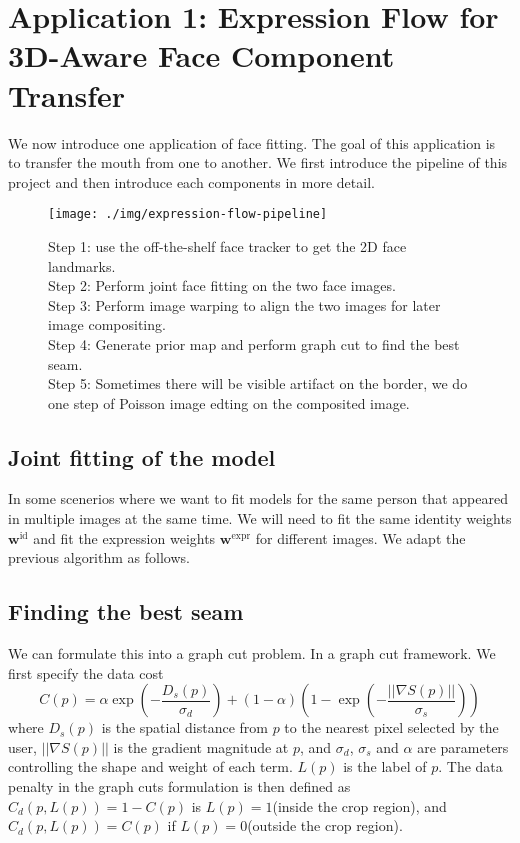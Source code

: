 
\section{Application 1: Expression Flow for 3D-Aware Face
Component Transfer}
We now introduce one application of face fitting. The goal of this application is to transfer the mouth from one to another. We first introduce the pipeline of this project and then introduce each components in more detail.
\begin{figure}[H]
\texttt{[image: ./img/expression-flow-pipeline]}
\caption{Step 1: use the off-the-shelf face tracker to get the 2D face landmarks. \\
Step 2: Perform joint face fitting on the two face images. \\
Step 3: Perform image warping to align the two images for later image compositing. \\
Step 4: Generate prior map and perform graph cut to find the best seam. \\
Step 5: Sometimes there will be visible artifact on the border, we do one step of Poisson image edting on the composited image.}
\end{figure}

\subsection{Joint fitting of the model}
In some scenerios where we want to fit models for the same person that appeared in multiple images at the same time. We will need to fit the same identity weights $\mathbf{w}^{\text{id}}$ and fit the expression weights $\mathbf{w}^{\text{expr}}$ for different images. We adapt the previous algorithm as follows.

\subsection{Finding the best seam}
We can formulate this into a graph cut problem. In a graph cut framework. We first specify the data cost 
$$C(p) = \alpha \exp(-\frac{D_s(p)}{\sigma_d}) + (1 - \alpha) \left(1 - \exp(-\frac{||\nabla S(p)||}{\sigma_s})\right)$$
where $D_s(p)$ is the spatial distance from $p$ to the nearest pixel selected by the user, $||\nabla S(p)||$ is the gradient magnitude at $p$, and $\sigma_d$, $\sigma_s$ and $\alpha$ are parameters controlling the shape and weight of each term. $L(p)$ is the label of $p$. The data penalty in the graph cuts formulation is then defined as $C_d(p, L(p)) = 1 - C(p)$ is $L(p) = 1$(inside the crop region), and $C_d(p, L(p)) = C(p)$ if $L(p) = 0$(outside the crop region). 

